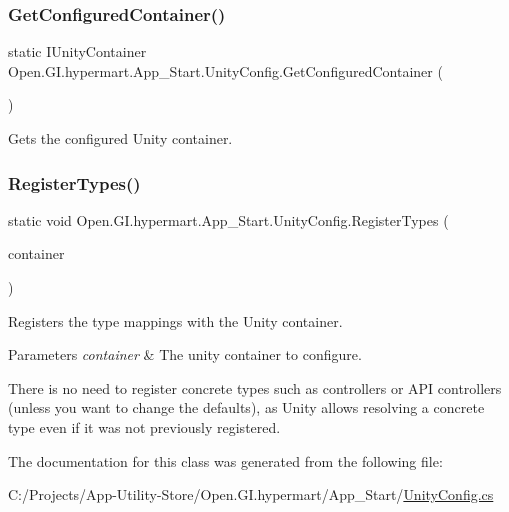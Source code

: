 \subsubsection{\texorpdfstring{Get\+Configured\+Container()}{GetConfiguredContainer()}}
{\footnotesize\ttfamily static I\+Unity\+Container Open.\+G\+I.\+hypermart.\+App\+\_\+\+Start.\+Unity\+Config.\+Get\+Configured\+Container (\begin{DoxyParamCaption}{ }\end{DoxyParamCaption})\hspace{0.3cm}{\ttfamily [static]}}



Gets the configured Unity container. 

\hypertarget{class_open_1_1_g_i_1_1hypermart_1_1_app___start_1_1_unity_config_abba412f0f6c67fdd94a735c3b09cc03e}{}\label{class_open_1_1_g_i_1_1hypermart_1_1_app___start_1_1_unity_config_abba412f0f6c67fdd94a735c3b09cc03e} 
\subsubsection{\texorpdfstring{Register\+Types()}{RegisterTypes()}}
{\footnotesize\ttfamily static void Open.\+G\+I.\+hypermart.\+App\+\_\+\+Start.\+Unity\+Config.\+Register\+Types (\begin{DoxyParamCaption}\item[{I\+Unity\+Container}]{container }\end{DoxyParamCaption})\hspace{0.3cm}{\ttfamily [static]}}



Registers the type mappings with the Unity container.


\begin{DoxyParams}{Parameters}
{\em container} & The unity container to configure.\\
\hline
\end{DoxyParams}


There is no need to register concrete types such as controllers or A\+PI controllers (unless you want to change the defaults), as Unity allows resolving a concrete type even if it was not previously registered.

The documentation for this class was generated from the following file\+:\begin{DoxyCompactItemize}
\item 
C\+:/\+Projects/\+App-\/\+Utility-\/\+Store/\+Open.\+G\+I.\+hypermart/\+App\+\_\+\+Start/\hyperlink{_unity_config_8cs}{Unity\+Config.\+cs}\end{DoxyCompactItemize}
